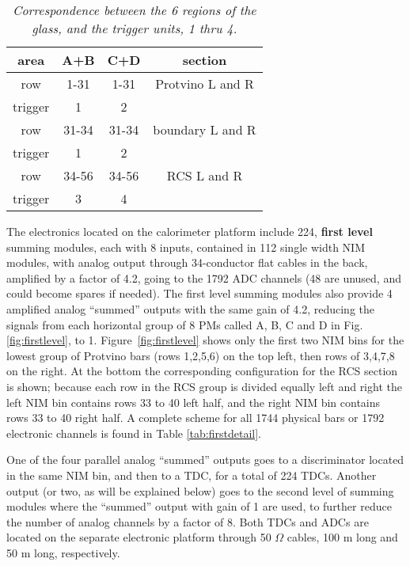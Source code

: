 \documentclass{chowto}
\begin{document}
\begin{table}[!]
\caption[]{\it Correspondence between the 6 regions of the glass, and the
trigger units, 1 thru 4.}
\begin{center}
\begin{tabular}{|c|c|c|c|}
\hline
area & A+B & C+D & section \\ \hline
row & 1-31 & 1-31 & Protvino L and R\\
trigger & 1 & 2 & \\ \hline
row & 31-34 & 31-34 & boundary L and R\\
trigger & 1 & 2 & \\ \hline
row & 34-56 & 34-56 & RCS L and R \\
trigger & 3 & 4 & \\ \hline
\end{tabular}
\end{center}
\label{tab:triggerscheme}
\end{table}


The electronics located on the calorimeter platform include 224,   
{\bf first level} summing modules, each with 8 inputs, contained 
in 112 single width NIM modules, with analog output 
through 34-conductor flat cables in the back, amplified by a factor 
of 4.2, going to the 1792 ADC channels (48 are unused, and could 
become spares if needed). 
The first level summing modules also provide 4 amplified analog ``summed'' 
outputs with the same gain of 4.2, reducing the signals from each 
horizontal group of 8 PMs called A, B, C and D in Fig. \ref{fig:firstlevel}, 
to 1. Figure~\ref{fig:firstlevel} shows only the first two NIM bins for the 
lowest group of 
Protvino bars (rows 1,2,5,6) on the top left, then rows of 3,4,7,8 on the 
right. 
At the bottom the corresponding configuration for the RCS section is shown;
because each row in the RCS group is divided equally left and right the left 
NIM bin contains rows 33 to 40 left half, and the right NIM bin contains 
rows 33 to
40 right half. A complete scheme for all 1744 physical bars or 1792
electronic channels is found in Table \ref{tab:firstdetail}.
 
One of the four
parallel analog ``summed'' outputs goes to a discriminator located in the
same NIM bin, and then to a TDC, for a total of 224 TDCs. Another output 
(or two, as will be explained below) goes to the second level of summing 
modules where the ``summed'' output with gain of 1 are used, to further reduce the number
of analog channels by a factor of 8.
Both TDCs and ADCs 
are located on the separate electronic platform through 50 $\Omega$ cables, 
100 m long and 50 m long, respectively. 
\end{document}
